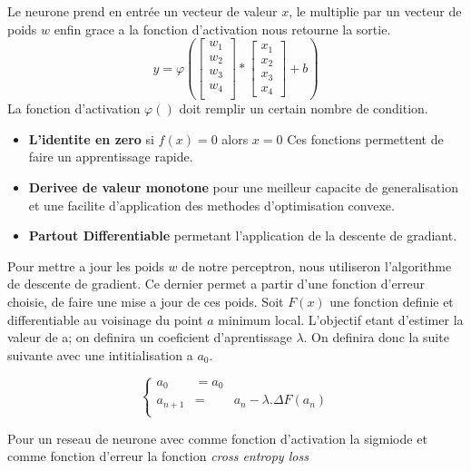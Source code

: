 \documentclass[twoside,twocolumn]{article}
\begin{document}
Le neurone prend en entrée un vecteur de valeur $x$, le multiplie par un vecteur de poids $w$ enfin grace a la fonction d'activation
nous retourne la sortie.
\[
y = \varphi(
\left[
  \begin{array}{ccc}
    w_{1}\\
    w_{2}\\
    w_{3}\\
    w_{4}\\  
  \end{array}
\right]*
\begin{bmatrix}
           x_{1} \\
           x_{2} \\
           x_{3} \\
           x_{4}
         \end{bmatrix}
+ b)\]
La fonction d'activation $\varphi()$ doit remplir un certain nombre de condition.
\begin{itemize}
  \item \textbf{L'identite en zero} si $f(x) = 0$ alors $x = 0$ \cite{Sussillo2014RandomWI} Ces fonctions permettent de faire un apprentissage rapide.
  \item \textbf{Derivee de valeur monotone}\cite{WU20093432} pour une meilleur capacite de generalisation et une facilite d'application des methodes d'optimisation convexe.
  \item \textbf{Partout Differentiable}\cite{Rumelhart1} permetant l'application de la descente de gradiant.
\end{itemize}

Pour mettre a jour les poids $w$ de notre perceptron, nous utiliseron l'algorithme de descente de gradient. Ce dernier permet a partir d'une fonction d'erreur choisie, de faire
une mise a jour de ces poids.
Soit $F(x)$ une fonction definie et differentiable au voisinage du point $a$ minimum local. L'objectif etant d'estimer la valeur de a; on definira un coeficient d'aprentissage $\lambda$.
On definira donc la suite suivante avec une intitialisation a $a_0$. 

\[\left\{
  \begin{array}{rcr}
    a_{0} & =  a_0 \\
    a_{n+1} & = & a_{n} - \lambda. \Delta F(a_n)\\
  \end{array}
\right.\]

Pour un reseau de neurone avec comme fonction d'activation la sigmiode et comme fonction d'erreur la fonction \textit{cross entropy loss}
\end{document}
